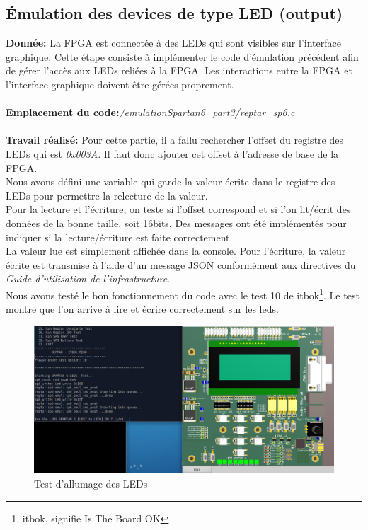 \subsection{Émulation des devices de type LED (output)}
\textbf{Donnée: }La FPGA est connectée à des LEDs qui sont visibles sur l'interface graphique. Cette étape consiste à
implémenter le code d'émulation précédent afin de gérer l'accès aux LEDs reliées à la FPGA.
Les interactions entre la FPGA et l'interface graphique doivent être gérées proprement. \\\\
\textbf{Emplacement du code:}\textit{/emulationSpartan6\_part3/reptar\_sp6.c}\\\\
\textbf{Travail réalisé: }Pour cette partie, il a fallu rechercher l'offset du registre des LEDs qui est \textit{0x003A}. Il faut donc ajouter cet offset à l'adresse de base de la FPGA.\\ Nous avons défini une variable qui garde la valeur écrite dans le registre des LEDs pour permettre la relecture de la valeur.\\ Pour la lecture et l'écriture, on teste si l'offset correspond et si l'on lit/écrit des données de la bonne taille, soit 16bits. Des messages ont été implémentés pour indiquer si la lecture/écriture est faite correctement.
\\La valeur lue est simplement affichée dans la console. Pour l'écriture, la valeur écrite est transmise à l'aide d'un message JSON conformément aux directives du \textit{Guide d'utilisation de l'infrastructure}.
\\Nous avons testé le bon fonctionnement du code avec le test 10 de itbok\footnote{itbok, signifie Is The Board OK}. Le test montre que l'on arrive à lire et écrire correctement sur les leds.
\begin{figure}[H]
	\begin{center}
		\includegraphics[width=15cm]{img/leds1.png}
		\caption{Test d'allumage des LEDs}
		\label{leds1}
	\end{center}
\end{figure}
